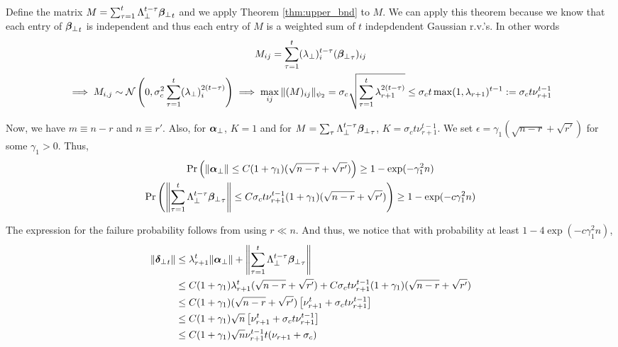 \documentclass[10pt]{article}
\newcommand{\norm}[1]{\left\|#1\right\|}
\begin{document}
Define the matrix $M = \sum_{\tau=1}^t \Lambda_\perp^{t-\tau}  {\bm{\beta}_{\perp}}_t$ and we apply Theorem \ref{thm:upper_bnd} to $M$. We can apply this theorem because we know that each entry of ${\bm{\beta}_{\perp}}_t$ is independent and thus each entry of $M$ is a weighted sum of $t$ indepdendent Gaussian r.v.'s. In other words
\begin{gather*}
M_{ij} = \sum_{\tau=1}^t (\lambda_\perp)_i^{t-\tau} ({\bm{\beta}_{\perp}}_{\tau})_{ij} \\
\implies M_{i,j} \sim \mathcal{N}\left(0, \sigma_c^2 \sum_{\tau=1}^t (\lambda_\perp)_i^{2(t-\tau)}\right)
\implies \max_{ij} \|(M)_{ij}\|_{\psi_2} = \sigma_c \sqrt{\sum_{\tau=1}^t \lambda_{r+1}^{2(t-\tau)}} \leq \sigma_c t \max(1, \lambda_{r+1})^{t-1} := \sigma_c t \nu_{r+1}^{t-1} 
\end{gather*}

Now, we have $m \equiv n-r$ and $n \equiv r'$. Also, for $\bm{\alpha}_{\perp}$, $K = 1$ and for $M = \sum_{\tau} \Lambda_\perp^{t-\tau}{\bm{\beta}_{\perp}}_\tau$, $K = \sigma_c t \nu_{r+1}^{t-1}$. We set $\epsilon = \gamma_1 (\sqrt{n-r} + \sqrt{r'})$ for some $\gamma_1 > 0$. Thus, 
\begin{gather*}
\Pr\left(\|\usin\| \leq C (1 + \gamma_1)(\sqrt{n-r} + \sqrt{r'})\right) \geq  1 - \exp(- \gamma_1^2 n) \\
\Pr\left(\norm{\sum_{\tau=1}^t \Lambda_\perp^{t-\tau} \wsin_\tau} \leq C \sigma_c t \nu_{r+1}^{t-1} (1 + \gamma_1)(\sqrt{n-r} + \sqrt{r'}) \right) \geq  1 - \exp(- c\gamma_1^2 n)
\end{gather*}

%
The expression for the failure probability follows from using $r \ll n$. And thus, we notice that with probability at least $1 - 4 \exp(- c\gamma_1^2 n)$, 
\begin{align*}
\|\utsin_t\| &\leq \lambda_{r+1}^t \|\usin\| + \norm{\sum_{\tau=1}^t \Lambda_\perp^{t-\tau} \wsin_\tau} \\
&\leq C(1+\gamma_1) \lambda_{r+1}^t(\sqrt{n-r} + \sqrt{r'}) + C \sigma_c t \nu_{r+1}^{t-1} (1 + \gamma_1)(\sqrt{n-r} + \sqrt{r'}) \\
&\leq C (1 + \gamma_1) (\sqrt{n-r} + \sqrt{r'}) \left[ \nu_{r+1}^t + \sigma_c t \nu_{r+1}^{t-1} \right] \\
&\leq C (1+ \gamma_1) \sqrt{n} \left[\nu_{r+1}^t +  \sigma_c t \nu_{r+1}^{t-1}  \right] \\
&\leq C (1+ \gamma_1) \sqrt{n} \nu_{r+1}^{t-1} t (\nu_{r+1} + \sigma_c) 
\end{align*}
\end{document}
